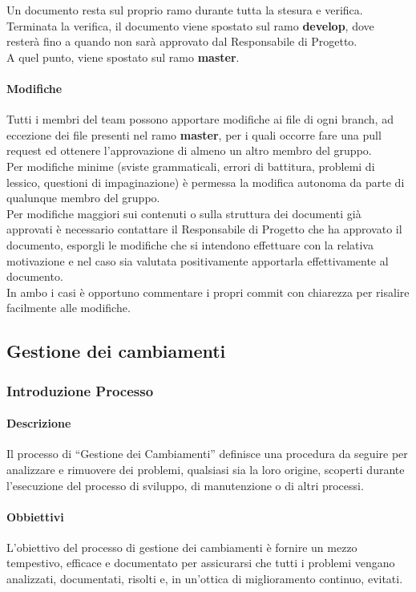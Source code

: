 				Un documento resta sul proprio ramo durante tutta la stesura e verifica.  \\
				Terminata la verifica, il documento viene spostato sul ramo \textbf{develop}, dove resterà fino a quando non sarà approvato dal Responsabile di Progetto. \\
				A quel punto, viene spostato sul ramo \textbf{master}.
				
			\paragraph{ Modifiche}
				Tutti i membri del team possono apportare modifiche ai file di ogni branch, ad eccezione dei file presenti nel ramo \textbf{master}, per i quali occorre fare una pull request ed ottenere l’approvazione di almeno un altro membro del gruppo. \\
				Per modifiche minime (sviste grammaticali, errori di battitura, problemi di lessico, questioni di impaginazione) è permessa la modifica autonoma da parte di qualunque membro del gruppo. \\
				Per modifiche maggiori sui contenuti o sulla struttura dei documenti già approvati è necessario contattare il Responsabile di Progetto che ha approvato il documento, esporgli le modifiche che si intendono effettuare con la relativa motivazione e nel caso sia valutata positivamente apportarla effettivamente al documento.\\
				In ambo i casi è opportuno commentare i propri commit con chiarezza per risalire facilmente alle modifiche.\\

	\subsection{Gestione dei cambiamenti}
		\subsubsection{Introduzione Processo}
			\paragraph{Descrizione}
				Il processo di “Gestione dei Cambiamenti” definisce una procedura da seguire per analizzare e rimuovere dei problemi, qualsiasi sia la loro origine, scoperti durante l'esecuzione del processo di sviluppo, di manutenzione o di altri processi.
			\paragraph{Obbiettivi}
				L'obiettivo del processo di gestione dei cambiamenti è fornire un mezzo tempestivo, efficace e documentato per assicurarsi che tutti i problemi vengano analizzati, documentati, risolti e, in un'ottica di miglioramento continuo, evitati.
